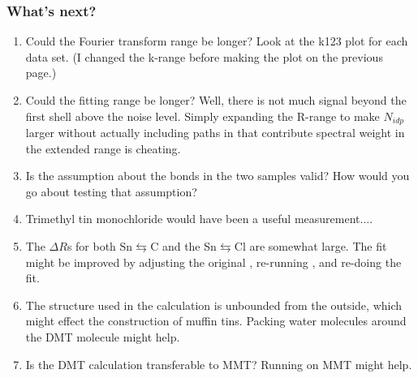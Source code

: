 \documentclass[10pt, xcolor=x11names, compress, handout]{beamer}
\begin{document}
\begin{frame}
  \frametitle{What's next?}
  \small
  \begin{enumerate}
  \item Could the Fourier transform range be longer?  Look at the k123
    plot for each data set.  (I changed the k-range before making the
    plot on the previous page.)
  \item Could the fitting range be longer?  Well, there is not much
    signal beyond the first shell above the noise level.  Simply
    expanding the R-range to make $N_{idp}$ larger without actually
    including paths in that contribute spectral weight in the extended
    range is cheating.
  \item Is the assumption about the bonds in the two samples valid?
    How would you go about testing that assumption?
  \item Trimethyl tin monochloride would have been a useful
    measurement....
  \item The $\Delta R$s for both Sn$\leftrightarrows$C and the
    Sn$\leftrightarrows$Cl are somewhat large.  The fit might be
    improved by adjusting the original , re-running
    {\feff}, and re-doing the fit.
  \item The structure used in the {\feff} calculation is unbounded
    from the outside, which might effect the construction of muffin
    tins.  Packing water molecules around the DMT molecule might help.
  \item Is the DMT {\feff} calculation transferable to MMT?  Running
    {\feff} on MMT might help.
  \end{enumerate}
\end{frame}
\end{document}
